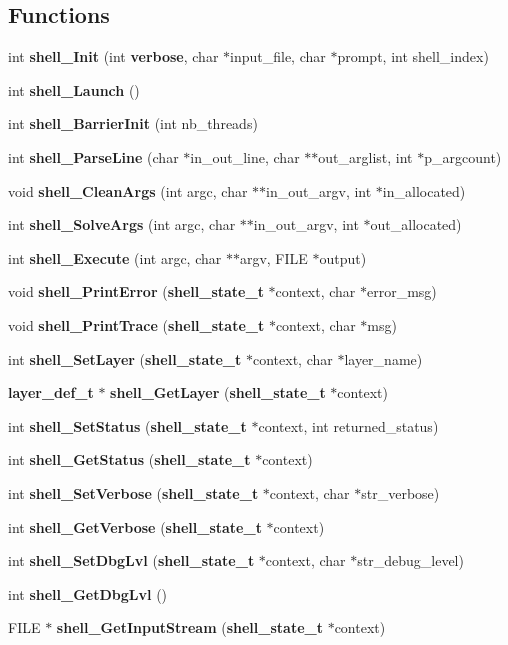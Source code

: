 \subsection*{Functions}
\begin{CompactItemize}
\item 
int {\bf shell\_\-Init} (int {\bf verbose}, char $\ast$input\_\-file, char $\ast$prompt, int shell\_\-index)
\item 
int {\bf shell\_\-Launch} ()
\item 
int {\bf shell\_\-Barrier\-Init} (int nb\_\-threads)
\item 
int {\bf shell\_\-Parse\-Line} (char $\ast$in\_\-out\_\-line, char $\ast$$\ast$out\_\-arglist, int $\ast$p\_\-argcount)
\item 
void {\bf shell\_\-Clean\-Args} (int argc, char $\ast$$\ast$in\_\-out\_\-argv, int $\ast$in\_\-allocated)
\item 
int {\bf shell\_\-Solve\-Args} (int argc, char $\ast$$\ast$in\_\-out\_\-argv, int $\ast$out\_\-allocated)
\item 
int {\bf shell\_\-Execute} (int argc, char $\ast$$\ast$argv, FILE $\ast$output)
\item 
void {\bf shell\_\-Print\-Error} ({\bf shell\_\-state\_\-t} $\ast$context, char $\ast$error\_\-msg)
\item 
void {\bf shell\_\-Print\-Trace} ({\bf shell\_\-state\_\-t} $\ast$context, char $\ast$msg)
\item 
int {\bf shell\_\-Set\-Layer} ({\bf shell\_\-state\_\-t} $\ast$context, char $\ast$layer\_\-name)
\item 
{\bf layer\_\-def\_\-t} $\ast$ {\bf shell\_\-Get\-Layer} ({\bf shell\_\-state\_\-t} $\ast$context)
\item 
int {\bf shell\_\-Set\-Status} ({\bf shell\_\-state\_\-t} $\ast$context, int returned\_\-status)
\item 
int {\bf shell\_\-Get\-Status} ({\bf shell\_\-state\_\-t} $\ast$context)
\item 
int {\bf shell\_\-Set\-Verbose} ({\bf shell\_\-state\_\-t} $\ast$context, char $\ast$str\_\-verbose)
\item 
int {\bf shell\_\-Get\-Verbose} ({\bf shell\_\-state\_\-t} $\ast$context)
\item 
int {\bf shell\_\-Set\-Dbg\-Lvl} ({\bf shell\_\-state\_\-t} $\ast$context, char $\ast$str\_\-debug\_\-level)
\item 
int {\bf shell\_\-Get\-Dbg\-Lvl} ()
\item 
FILE $\ast$ {\bf shell\_\-Get\-Input\-Stream} ({\bf shell\_\-state\_\-t} $\ast$context)

\end{CompactItemize}
